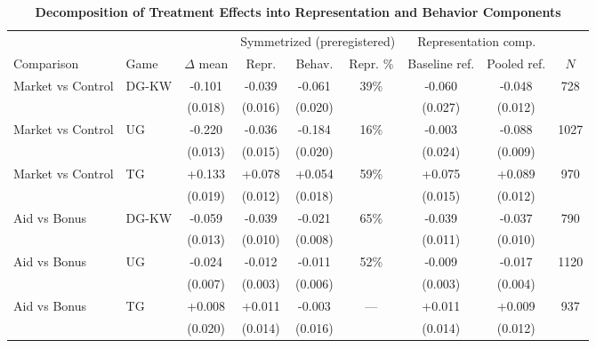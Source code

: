 \begin{table}[!htbp]
\centering
\footnotesize
\renewcommand{\arraystretch}{1.15}
\caption{\textbf{Decomposition of Treatment Effects into Representation and Behavior Components}}
\label{tab:oaxaca_catbelief}
\begin{tabular}{ll c cc c cc c}
\toprule
& & & \multicolumn{3}{c}{Symmetrized (preregistered)} & \multicolumn{2}{c}{Representation comp.} & \\
\cmidrule(lr){4-6}\cmidrule(lr){7-8}
Comparison & Game & $\Delta$ mean & Repr. & Behav. & Repr. \% & Baseline ref. & Pooled ref. & $N$ \\
\midrule
Market vs Control & DG-KW & -0.101 & -0.039 & -0.061 & 39\% & -0.060 & -0.048 & 728 \\
 & & (0.018) & (0.016) & (0.020) & & (0.027) & (0.012) & \\
\addlinespace[2pt]
Market vs Control & UG & -0.220 & -0.036 & -0.184 & 16\% & -0.003 & -0.088 & 1027 \\
 & & (0.013) & (0.015) & (0.020) & & (0.024) & (0.009) & \\
\addlinespace[2pt]
Market vs Control & TG & +0.133 & +0.078 & +0.054 & 59\% & +0.075 & +0.089 & 970 \\
 & & (0.019) & (0.012) & (0.018) & & (0.015) & (0.012) & \\
\addlinespace[2pt]
Aid vs Bonus & DG-KW & -0.059 & -0.039 & -0.021 & 65\% & -0.039 & -0.037 & 790 \\
 & & (0.013) & (0.010) & (0.008) & & (0.011) & (0.010) & \\
\addlinespace[2pt]
Aid vs Bonus & UG & -0.024 & -0.012 & -0.011 & 52\% & -0.009 & -0.017 & 1120 \\
 & & (0.007) & (0.003) & (0.006) & & (0.003) & (0.004) & \\
\addlinespace[2pt]
Aid vs Bonus & TG & +0.008 & +0.011 & -0.003 & --- & +0.011 & +0.009 & 937 \\
 & & (0.020) & (0.014) & (0.016) & & (0.014) & (0.012) & \\
\bottomrule
\end{tabular}
\begin{flushleft}

\end{flushleft}
\end{table}
